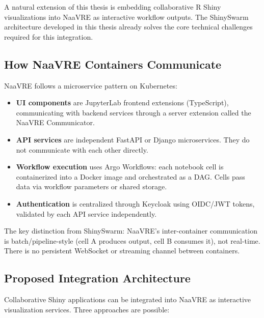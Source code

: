 \documentclass[11pt,a4paper]{article}
\begin{document}
A natural extension of this thesis is embedding collaborative R Shiny
visualizations into NaaVRE as interactive workflow outputs. The ShinySwarm
architecture developed in this thesis already solves the core technical
challenges required for this integration.

\subsection{How NaaVRE Containers Communicate}

NaaVRE follows a microservice pattern on Kubernetes:

\begin{itemize}
  \item \textbf{UI components} are JupyterLab frontend extensions
        (TypeScript), communicating with backend services through a
        server extension called the NaaVRE Communicator.
  \item \textbf{API services} are independent FastAPI or Django
        microservices. They do not communicate with each other directly.
  \item \textbf{Workflow execution} uses Argo Workflows: each notebook
        cell is containerized into a Docker image and orchestrated as a
        DAG. Cells pass data via workflow parameters or shared storage.
  \item \textbf{Authentication} is centralized through Keycloak using
        OIDC/JWT tokens, validated by each API service independently.
\end{itemize}

The key distinction from ShinySwarm: NaaVRE's inter-container
communication is batch/pipeline-style (cell A produces output, cell B
consumes it), not real-time. There is no persistent WebSocket or
streaming channel between containers.

\subsection{Proposed Integration Architecture}

Collaborative Shiny applications can be integrated into NaaVRE as
interactive visualization services. Three approaches are possible:
\end{document}
